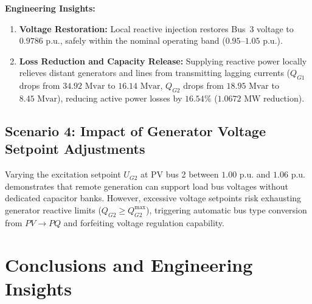 \documentclass[12pt,a4paper,oneside]{report}
\begin{document}
\noindent \textbf{Engineering Insights:}
\begin{enumerate}
    \item \textbf{Voltage Restoration:} Local reactive injection restores Bus~3 voltage to $0.9786\text{ p.u.}$, safely within the nominal operating band ($0.95$--$1.05\text{ p.u.}$).
    \item \textbf{Loss Reduction and Capacity Release:} Supplying reactive power locally relieves distant generators and lines from transmitting lagging currents ($Q_{G1}$ drops from $34.92\text{ Mvar}$ to $16.14\text{ Mvar}$, $Q_{G2}$ drops from $18.95\text{ Mvar}$ to $8.45\text{ Mvar}$), reducing active power losses by $16.54\%$ ($1.0672\text{ MW}$ reduction).
\end{enumerate}

\section{Scenario 4: Impact of Generator Voltage Setpoint Adjustments}
Varying the excitation setpoint $U_{G2}$ at PV bus 2 between $1.00\text{ p.u.}$ and $1.06\text{ p.u.}$ demonstrates that remote generation can support load bus voltages without dedicated capacitor banks. However, excessive voltage setpoints risk exhausting generator reactive limits ($Q_{G2} \ge Q_{G2}^{\max}$), triggering automatic bus type conversion from $PV \to PQ$ and forfeiting voltage regulation capability.

\chapter{Conclusions and Engineering Insights}
\end{document}
